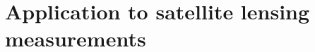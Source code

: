 \documentclass[usenatbib,fleqn]{mnras}
\newcommand{\eagle}{EAGLE}
\begin{document}


\section{Application to satellite lensing measurements}\label{s:lensing}




\end{document}
